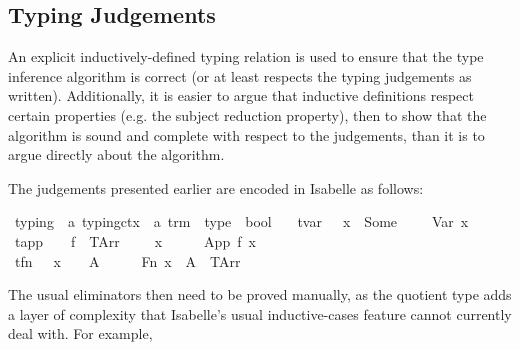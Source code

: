 \subsection{Typing Judgements}
An explicit inductively-defined typing relation is used to ensure that the type inference algorithm is correct (or at least respects the typing judgements as written).
Additionally, it is easier to argue that inductive definitions respect certain properties (e.g. the subject reduction property), then to show that the algorithm is sound and complete with respect to the judgements, than it is to argue directly about the algorithm.

The judgements presented earlier are encoded in Isabelle as follows:

\begin{implementation}
\isamarkupfalse%
\ typing\ {\isacharcolon}{\isacharcolon}\ {\isachardoublequoteopen}{\isacharprime}a\ typing{\isacharunderscore}ctx\ {\isasymRightarrow}\ {\isacharprime}a\ trm\ {\isasymRightarrow}\ type\ {\isasymRightarrow}\ bool{\isachardoublequoteclose}\  \isanewline
\ \ tvar{\isacharcolon}\ \ {\isachardoublequoteopen}{\isasymGamma}\ x\ {\isacharequal}\ Some\ {\isasymtau}\ {\isasymLongrightarrow}\ {\isasymGamma}\ {\isasymturnstile}\ Var\ x\ {\isacharcolon}\ {\isasymtau}{\isachardoublequoteclose}\isanewline
{\isacharbar}\ tapp{\isacharcolon}\ \ {\isachardoublequoteopen}{\isasymlbrakk}{\isasymGamma}\ {\isasymturnstile}\ f\ {\isacharcolon}\ {\isacharparenleft}TArr\ {\isasymtau}\ {\isasymsigma}{\isacharparenright}{\isacharsemicolon}\ {\isasymGamma}\ {\isasymturnstile}\ x\ {\isacharcolon}\ {\isasymtau}{\isasymrbrakk}\ {\isasymLongrightarrow}\ {\isasymGamma}\ {\isasymturnstile}\ App\ f\ x\ {\isacharcolon}\ {\isasymsigma}{\isachardoublequoteclose}\isanewline
{\isacharbar}\ tfn{\isacharcolon}\ \ \ {\isachardoublequoteopen}{\isasymGamma}{\isacharparenleft}x\ {\isasymmapsto}\ {\isasymtau}{\isacharparenright}\ {\isasymturnstile}\ A\ {\isacharcolon}\ {\isasymsigma}\ {\isasymLongrightarrow}\ {\isasymGamma}\ {\isasymturnstile}\ Fn\ x\ {\isasymtau}\ A\ {\isacharcolon}\ {\isacharparenleft}TArr\ {\isasymtau}\ {\isasymsigma}{\isacharparenright}{\isachardoublequoteclose}\isanewline
\end{implementation}

The usual eliminators then need to be proved manually, as the quotient type adds a layer of complexity that Isabelle's usual inductive-cases feature cannot currently deal with.
For example,


